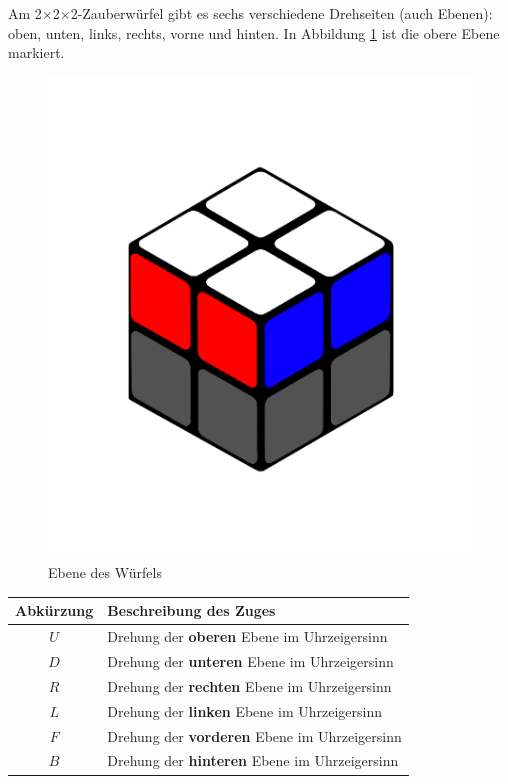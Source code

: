 \documentclass[12pt,a4paper, usenames, dvipsnames]{article}
\theoremstyle{mystyle}
\theoremstyle{definition}
\newcommand{\Ttwo}{2$\times$2$\times$2-}
\begin{document}
\label{Abschnitt_GrundzügeWürfel}
Am \Ttwo Zauberwürfel gibt es sechs verschiedene Drehseiten (auch Ebenen): oben, unten, links, rechts, vorne und hinten. 
In Abbildung \ref{Abbildung_Ebene} ist die obere Ebene markiert.

\begin{figure}[H]
\centering
\includegraphics[scale=0.1]{ebene.png}
\caption[Ebene des Würfels]{Ebene des Würfels}
\label{Abbildung_Ebene}
\end{figure}

\begin{center}
\begin{tabular}{cl}
\toprule
\textbf{Abkürzung} & \textbf{Beschreibung des Zuges} \\
\midrule
$U$ & Drehung der \textbf{oberen} Ebene im Uhrzeigersinn \\
$D$ & Drehung der \textbf{unteren} Ebene im Uhrzeigersinn \\
$R$ & Drehung der \textbf{rechten} Ebene im Uhrzeigersinn \\
$L$ & Drehung der \textbf{linken} Ebene im Uhrzeigersinn \\
$F$ & Drehung der \textbf{vorderen} Ebene im Uhrzeigersinn \\
$B$ & Drehung der \textbf{hinteren} Ebene im Uhrzeigersinn \\
\bottomrule
\end{tabular} 
\end{center}
\end{document}
